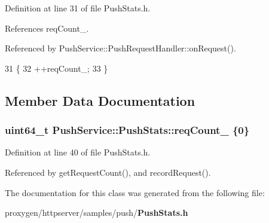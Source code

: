 Definition at line 31 of file Push\+Stats.\+h.



References req\+Count\+\_\+.



Referenced by Push\+Service\+::\+Push\+Request\+Handler\+::on\+Request().


\begin{DoxyCode}
31                                \{
32     ++reqCount_;
33   \}
\end{DoxyCode}


\subsection{Member Data Documentation}
\subsubsection[{req\+Count\+\_\+}]{\setlength{\rightskip}{0pt plus 5cm}uint64\+\_\+t Push\+Service\+::\+Push\+Stats\+::req\+Count\+\_\+ \{0\}\hspace{0.3cm}{\ttfamily [private]}}\label{classPushService_1_1PushStats_a32c65151025dbe99b56ebcb5371fcfe6}


Definition at line 40 of file Push\+Stats.\+h.



Referenced by get\+Request\+Count(), and record\+Request().



The documentation for this class was generated from the following file\+:\begin{DoxyCompactItemize}
\item 
proxygen/httpserver/samples/push/{\bf Push\+Stats.\+h}\end{DoxyCompactItemize}
